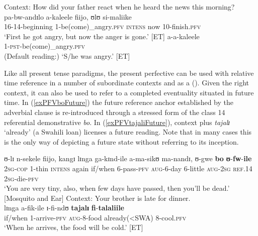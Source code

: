 \begin{exe}
\ex \label{exPRSPFVInchoativeDynamic} Context: How did your father react when he heard the news this morning?\\
\gll pa-bw-andɪlo a-kaleele fiijo, ʊlʊ si-maliike\\
16-14-beginning 1-be(come)\_angry.\textsc{pfv} \textsc{intens} now 10-finish.\textsc{pfv}\\
\glt `First he got angry, but now the anger is gone.' [ET]
\ex \label{exPRSPFVnotPSTstate} \gll a-a-kaleele\\
1-\textsc{pst}-be(come)\_angry.\textsc{pfv}\\
\glt (Default reading:) \lq S/he was angry.' [ET]
\end{exe}

Like all present tense paradigms, the present perfective can be used with relative time reference in a number of subordinate contexts and as a  (). Given the right context, it can also be used to refer to a completed eventuality situated in future time. In (\ref{exPFVboFuture}) the future reference anchor established by the adverbial clause is re-introduced through a stressed form of the class 14 referential demonstrative \textit{bo}. In (\ref{exPFVtajaliFuture}), context plus \textit{tajalɪ} \lq already' (a Swahili loan) licenses a future reading. Note that in many cases this is the only way of depicting a future state without referring to its inception.

\begin{exe}
\ex \label{exPFVboFuture}
\gll ʊ-lɪ n-sekele fiijo, kangɪ lɪnga ga-kɪnd-ile a-ma-sikʊ ma-nandɪ, ʊ-gwe \textbf{bo} \textbf{ʊ}-\textbf{fw}-\textbf{ile}\\
\textsc{2sg}-\textsc{cop} 1-thin \textsc{intens} again if/when 6-pass-\textsc{pfv} \textsc{aug}-6-day 6-little \textsc{aug}-\textsc{2sg} \textsc{ref.14} \textsc{2sg}-die-\textsc{pfv}\\
\glt `‎‎You are very tiny, also, when few days have passed, then you'll be dead.' [Mosquito and Ear]
\ex \label{exPFVtajaliFuture} Context: Your brother is late for dinner.\\
\gll lɪnga a-fik-ile ɪ-fi-ndʊ \textbf{tajalɪ} \textbf{fi}-\textbf{talaliile}\\
if/when 1-arrive-\textsc{pfv} \textsc{aug}-8-food already(<SWA) 8-cool.\textsc{pfv}\\
\glt `When he arrives, the food will be cold.' [ET]
\end{exe}

